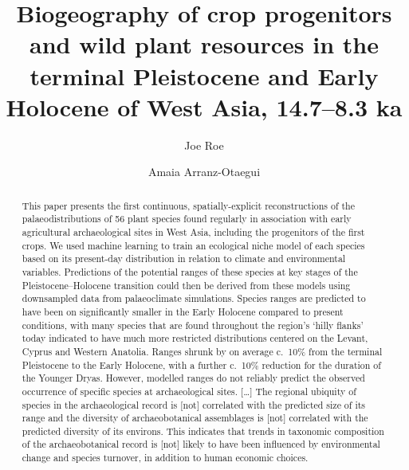 \documentclass[
  authoryear,
  preprint]{elsarticle}
\begin{document}
\begin{frontmatter}
\title{Biogeography of crop progenitors and wild plant resources in the
terminal Pleistocene and Early Holocene of West Asia, 14.7--8.3 ka}
\author[1,2]{Joe Roe%
%
}
\author[3]{Amaia Arranz-Otaegui%
%
}





        
\begin{abstract}
This paper presents the first continuous, spatially-explicit
reconstructions of the palaeodistributions of 56 plant species found
regularly in association with early agricultural archaeological sites in
West Asia, including the progenitors of the first crops. We used machine
learning to train an ecological niche model of each species based on its
present-day distribution in relation to climate and environmental
variables. Predictions of the potential ranges of these species at key
stages of the Pleistocene--Holocene transition could then be derived
from these models using downsampled data from palaeoclimate simulations.
Species ranges are predicted to have been on significantly smaller in
the Early Holocene compared to present conditions, with many species
that are found throughout the region's `hilly flanks' today indicated to
have much more restricted distributions centered on the Levant, Cyprus
and Western Anatolia. Ranges shrunk by on average c.~10\% from the
terminal Pleistocene to the Early Holocene, with a further c.~10\%
reduction for the duration of the Younger Dryas. However, modelled
ranges do not reliably predict the observed occurrence of specific
species at archaeological sites. {[}\ldots{]} The regional ubiquity of
species in the archaeological record is {[}not{]} correlated with the
predicted size of its range and the diversity of archaeobotanical
assemblages is {[}not{]} correlated with the predicted diversity of its
environs. This indicates that trends in taxonomic composition of the
archaeobotanical record is {[}not{]} likely to have been influenced by
environmental change and species turnover, in addition to human economic
choices.
\end{abstract}





\end{frontmatter}
    
\end{document}
